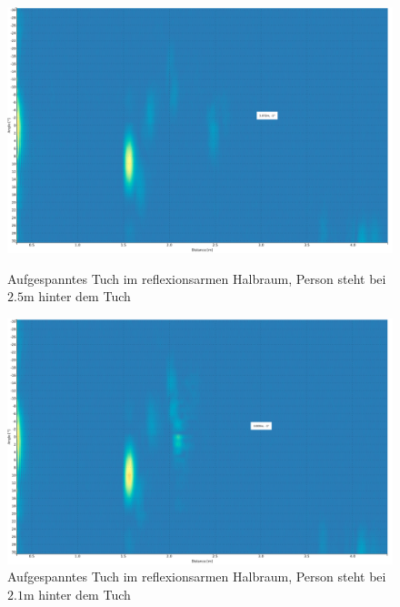\clearpage
\begin{figure}[htb]
\begin{minipage}{1.0\textwidth}
\includegraphics[width=\textwidth]{graphics/image_appendix_bild_4.png}
\caption{Aufgespanntes Tuch im reflexionsarmen Halbraum, Person steht bei $2.5 \mathrm{m}$ hinter dem Tuch} %
\label{fig:image_appendix_bild_4}
%
\end{minipage}
\begin{minipage}{1.0\textwidth}
\includegraphics[width=\textwidth]{graphics/image_appendix_bild_5.png}
\caption{Aufgespanntes Tuch im reflexionsarmen Halbraum, Person steht bei $2.1 \mathrm{m}$ hinter dem Tuch} %
\label{fig:image_appendix_bild_5}
%
\end{minipage}
\end{figure}



